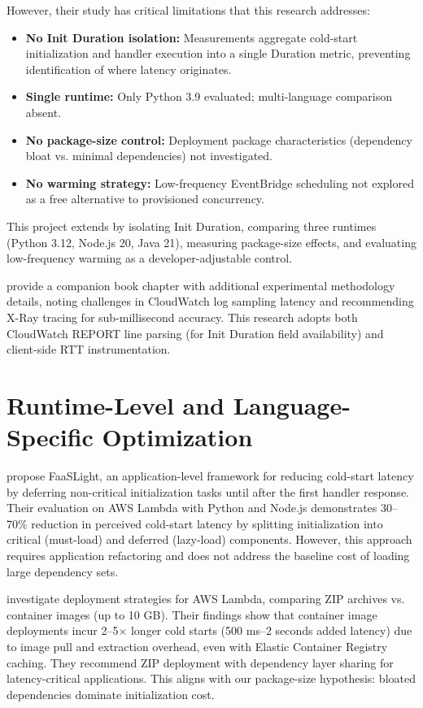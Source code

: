 However, their study has critical limitations that this research addresses:

\begin{itemize}
    \item \textbf{No Init Duration isolation:} Measurements aggregate cold-start initialization and handler execution into a single Duration metric, preventing identification of where latency originates.
    \item \textbf{Single runtime:} Only Python 3.9 evaluated; multi-language comparison absent.
    \item \textbf{No package-size control:} Deployment package characteristics (dependency bloat vs. minimal dependencies) not investigated.
    \item \textbf{No warming strategy:} Low-frequency EventBridge scheduling not explored as a free alternative to provisioned concurrency.
\end{itemize}

This project extends \citet{bluemke2025ijet} by isolating Init Duration, comparing three runtimes (Python 3.12, Node.js 20, Java 21), measuring package-size effects, and evaluating low-frequency warming as a developer-adjustable control.

\citet{bluemke2025experiment} provide a companion book chapter with additional experimental methodology details, noting challenges in CloudWatch log sampling latency and recommending X-Ray tracing for sub-millisecond accuracy. This research adopts both CloudWatch REPORT line parsing (for Init Duration field availability) and client-side RTT instrumentation.

\section{Runtime-Level and Language-Specific Optimization}

\citet{liu2023faaslight} propose FaaSLight, an application-level framework for reducing cold-start latency by deferring non-critical initialization tasks until after the first handler response. Their evaluation on AWS Lambda with Python and Node.js demonstrates 30–70\% reduction in perceived cold-start latency by splitting initialization into critical (must-load) and deferred (lazy-load) components. However, this approach requires application refactoring and does not address the baseline cost of loading large dependency sets.

\citet{dantas2022deployment} investigate deployment strategies for AWS Lambda, comparing ZIP archives vs. container images (up to 10 GB). Their findings show that container image deployments incur 2–5× longer cold starts (500 ms–2 seconds added latency) due to image pull and extraction overhead, even with Elastic Container Registry caching. They recommend ZIP deployment with dependency layer sharing for latency-critical applications. This aligns with our package-size hypothesis: bloated dependencies dominate initialization cost.

